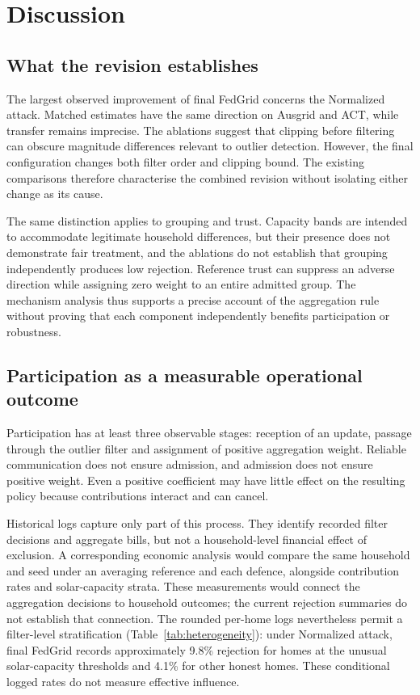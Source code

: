 \section{Discussion}
\label{sec:discussion}
\subsection{What the revision establishes}
The largest observed improvement of final FedGrid concerns the Normalized attack. Matched estimates have the same direction on Ausgrid and ACT, while transfer remains imprecise. The ablations suggest that clipping before filtering can obscure magnitude differences relevant to outlier detection. However, the final configuration changes both filter order and clipping bound. The existing comparisons therefore characterise the combined revision without isolating either change as its cause.

The same distinction applies to grouping and trust. Capacity bands are intended to accommodate legitimate household differences, but their presence does not demonstrate fair treatment, and the ablations do not establish that grouping independently produces low rejection. Reference trust can suppress an adverse direction while assigning zero weight to an entire admitted group. The mechanism analysis thus supports a precise account of the aggregation rule without proving that each component independently benefits participation or robustness.

\subsection{Participation as a measurable operational outcome}
Participation has at least three observable stages: reception of an update, passage through the outlier filter and assignment of positive aggregation weight. Reliable communication does not ensure admission, and admission does not ensure positive weight. Even a positive coefficient may have little effect on the resulting policy because contributions interact and can cancel.

Historical logs capture only part of this process. They identify recorded filter decisions and aggregate bills, but not a household-level financial effect of exclusion. A corresponding economic analysis would compare the same household and seed under an averaging reference and each defence, alongside contribution rates and solar-capacity strata. These measurements would connect the aggregation decisions to household outcomes; the current rejection summaries do not establish that connection. The rounded per-home logs nevertheless permit a filter-level stratification (Table~\ref{tab:heterogeneity}): under Normalized attack, final FedGrid records approximately 9.8\% rejection for homes at the unusual solar-capacity thresholds and 4.1\% for other honest homes. These conditional logged rates do not measure effective influence.

